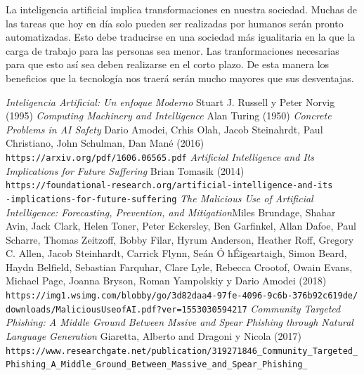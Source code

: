 \documentclass[12pt,a4paper]{article}
\begin{document}
La inteligencia artificial implica transformaciones en nuestra sociedad. Muchas de las tareas que hoy en día solo pueden ser realizadas por humanos serán pronto automatizadas. Esto debe traducirse en una sociedad más igualitaria en la que la carga de trabajo para las personas sea menor. Las tranformaciones necesarias para que esto así sea deben realizarse en el corto plazo. De esta manera los beneficios que la tecnología nos traerá serán mucho mayores que sus desventajas.

\newpage

\begin{thebibliography}{9}

 \textit{Inteligencia Artificial: Un enfoque Moderno} Stuart J. Russell y Peter Norvig (1995)
\textit{Computing Machinery and Intelligence} Alan Turing (1950)
 \textit{Concrete Problems in AI Safety} Dario Amodei, Crhis Olah, Jacob Steinahrdt, Paul Christiano, John Schulman, Dan Mané (2016)
\\\texttt{https://arxiv.org/pdf/1606.06565.pdf}
 \textit{Artificial Intelligence and Its Implications for Future Suffering} Brian Tomasik (2014)
\\\texttt{https://foundational-research.org/artificial-intelligence-and-its}
\\\texttt{-implications-for-future-suffering}
 \textit{The Malicious Use of Artificial Intelligence: Forecasting, Prevention, and Mitigation}Miles Brundage, Shahar Avin,  Jack Clark, Helen Toner, Peter Eckersley, Ben Garfinkel, Allan Dafoe, Paul Scharre, Thomas Zeitzoff, Bobby Filar, Hyrum Anderson, Heather Roff, Gregory C. Allen, Jacob Steinhardt, Carrick Flynn, Seán Ó hÉigeartaigh, Simon Beard, Haydn Belfield, Sebastian Farquhar, Clare Lyle, Rebecca Crootof, Owain Evans, Michael Page, Joanna Bryson, Roman Yampolskiy y Dario Amodei (2018)
\\\texttt{https://img1.wsimg.com/blobby/go/3d82daa4-97fe-4096-9c6b-376b92c619de/}
\\\texttt{downloads/MaliciousUseofAI.pdf?ver=1553030594217}
 \textit{Community Targeted Phishing: A Middle Ground Between Mssive and Spear Phishing through Natural Language Generation} Giaretta, Alberto and Dragoni y Nicola (2017)
\\\texttt{https://www.researchgate.net/publication/319271846\_Community\_Targeted\_}
\\\texttt{Phishing\_A\_Middle\_Ground\_Between\_Massive\_and\_Spear\_Phishing\_}

\end{thebibliography}
\end{document}
